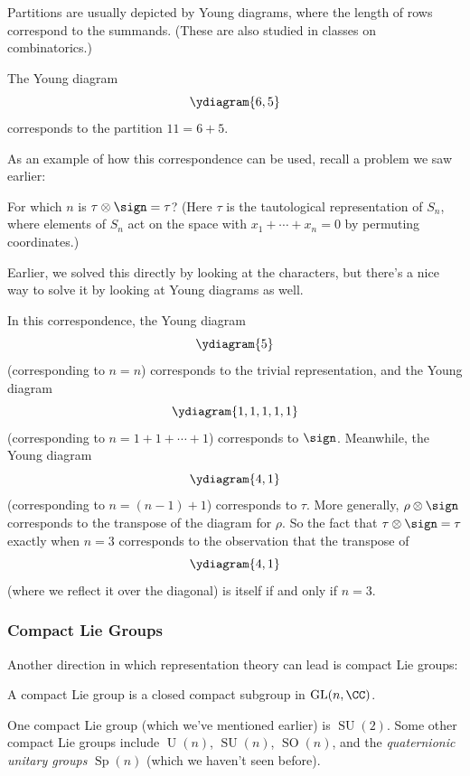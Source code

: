 Partitions are usually depicted by Young diagrams, where the length of rows correspond to the summands. (These are also studied in classes on combinatorics.)

\begin{example}
The Young diagram \[\ydiagram{6,5}\] corresponds to the partition $11 = 6 + 5$. 
\end{example}

As an example of how this correspondence can be used, recall a problem we saw earlier:

\begin{example}
For which $n$ is $\tau \otimes \sign = \tau$? (Here $\tau$ is the tautological representation of $S_n$, where elements of $S_n$ act on the space with $x_1 + \cdots + x_n = 0$ by permuting coordinates.)
\end{example}

Earlier, we solved this directly by looking at the characters, but there's a nice way to solve it by looking at Young diagrams as well. 

In this correspondence, the Young diagram \[\ydiagram{5}\] (corresponding to $n = n$) corresponds to the trivial representation, and the Young diagram \[\ydiagram{1,1,1,1,1}\] (corresponding to $n = 1 + 1 + \cdots + 1$) corresponds to $\sign$. Meanwhile, the Young diagram \[\ydiagram{4,1}\] (corresponding to $n = (n - 1) + 1$) corresponds to $\tau$. More generally, $\rho \otimes \sign$ corresponds to the transpose of the diagram for $\rho$. So the fact that $\tau \otimes \sign = \tau$ exactly when $n = 3$ corresponds to the observation that the transpose of \[\ydiagram{4,1}\] (where we reflect it over the diagonal) is itself if and only if $n = 3$. 

\subsubsection{Compact Lie Groups}

Another direction in which representation theory can lead is compact Lie groups: 

\begin{definition}
A compact Lie group is a closed compact subgroup in $\operatorname{GL}(n, \CC)$. 
\end{definition}

\begin{example}
One compact Lie group (which we've mentioned earlier) is $\operatorname{SU}(2)$. Some other compact Lie groups include $\operatorname{U}(n)$, $\operatorname{SU}(n)$, $\operatorname{SO}(n)$, and the \emph{quaternionic unitary groups} $\operatorname{Sp}(n)$ (which we haven't seen before). 
\end{example}

